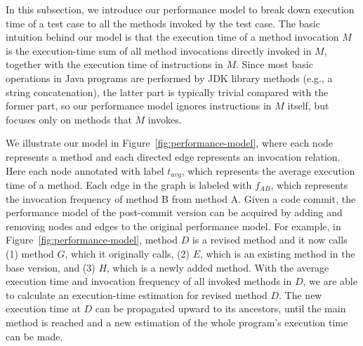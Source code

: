 In this subsection, we introduce our performance model to break  down execution time of a test case to all the methods invoked by the test case. The basic intuition behind our model is that the execution time of a method invocation $M$ is the execution-time sum of all method invocations directly invoked in $M$, together with the execution time of instructions in $M$. Since most basic operations in Java programs are performed by JDK library methods (e.g., a string concatenation), the latter part is typically trivial compared with the former part, so our performance model ignores instructions in $M$ itself, but focuses only on methods that $M$ invokes. 


We illustrate our model in Figure~\ref{fig:performance-model}, where each node represents a method and each directed edge represents an invocation relation. Here each node annotated with label $t_{avg}$, which represents the average execution time of a method. Each edge in the graph is labeled with $f_{AB}$, which represents the invocation frequency of method B from method A. Given a code commit, the performance model of the post-commit version can be acquired by adding and removing nodes and edges to the original performance model. For example, in Figure~\ref{fig:performance-model}, method $D$ is a revised method and it now calls (1) method $G$, which it originally calls, (2) $E$, which is an existing method in the base version, and (3) $H$, which is a newly added method. With the average execution time and invocation frequency of all invoked methods in $D$, we are able to calculate an execution-time estimation for revised method $D$. The new execution time at $D$ can be propagated upward to its ancestors, until the main method is reached and a new estimation of the whole program's execution time can be made. 



